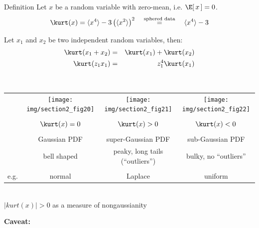 \begin{frame}{\subsecname}


\begin{block}{Definition}
	Let $x$ be a random variable with zero-mean, i.e. $\E \lbrack\,x\,\rbrack = 0$.
    \begin{equation}
    \label{eq:kurt}
        \kurt (x) = \langle x^4 \rangle - 3 
            \left( \langle x^2 \rangle \right)^2  \quad
                    \stackrel{\text{sphered data}}{=} \quad \langle x^4 \rangle - 3 
    \end{equation}
    
    Let $x_1$ and $x_2$ be two independent random variables, then:
    \begin{eqnarray*}
    \kurt(x_1 + x_2)& = & \kurt(x_1) + \kurt(x_2) \\
    \kurt(z_1 x_1)  & = & z_1^4 \kurt(x_1)
    \end{eqnarray*}
\end{block}
\end{frame}

\begin{frame}

\\

\begin{tabular}[h]{c c c c}
&
\texttt{[image: img/section2\_fig20]} &
\texttt{[image: img/section2\_fig21]} & 
\texttt{[image: img/section2\_fig22]} \\ \\

& $\kurt(x) = 0$ & $\kurt(x) > 0$ & $\kurt(x) < 0$\\ \\

&
Gaussian PDF &
super-Gaussian PDF&
sub-Gaussian PDF\\
&bell shaped & peaky, long tails (``outliers'')& bulky, no ``outliers'' \\\\
e.g.&normal & Laplace & uniform
\end{tabular}\\[1cm]

$|kurt(x)| > 0$ as a measure of nongaussianity 

\textbf{Caveat:}
\end{frame}


